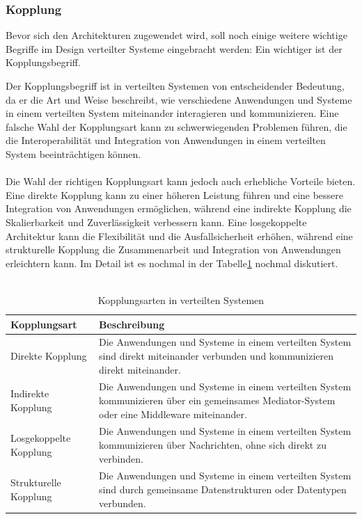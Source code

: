 \subsubsection{Kopplung}
Bevor sich den Architekturen zugewendet wird, soll noch einige weitere wichtige Begriffe im Design verteilter Systeme eingebracht werden: Ein wichtiger ist der Kopplungsbegriff. 

Der Kopplungsbegriff ist in verteilten Systemen von entscheidender Bedeutung, da er die Art und Weise beschreibt, wie verschiedene Anwendungen und Systeme in einem verteilten System miteinander interagieren und kommunizieren. Eine falsche Wahl der Kopplungsart kann zu schwerwiegenden Problemen führen, die die Interoperabilität und Integration von Anwendungen in einem verteilten System beeinträchtigen können.
\\\\
Die Wahl der richtigen Kopplungsart kann jedoch auch erhebliche Vorteile bieten. Eine direkte Kopplung kann zu einer höheren Leistung führen und eine bessere Integration von Anwendungen ermöglichen, während eine indirekte Kopplung die Skalierbarkeit und Zuverlässigkeit verbessern kann. Eine losgekoppelte Architektur kann die Flexibilität  und die Ausfallsicherheit erhöhen, während eine strukturelle Kopplung die Zusammenarbeit und Integration von Anwendungen erleichtern kann. Im Detail ist es nochmal in der Tabelle\ref{tab:kopplungsarten} nochmal diskutiert.
\\\\
\begin{table}[!h]
  \centering
  \caption{Kopplungsarten in verteilten Systemen}
  \label{tab:kopplungsarten}
  \begin{tabular}{|p{4cm}|p{7cm}|}
    \hline
    \textbf{Kopplungsart} & \textbf{Beschreibung} \\ \hline
    Direkte Kopplung & Die Anwendungen und Systeme in einem verteilten System sind direkt miteinander verbunden und kommunizieren direkt miteinander. \\ \hline
    Indirekte Kopplung & Die Anwendungen und Systeme in einem verteilten System kommunizieren über ein gemeinsames Mediator-System oder eine Middleware miteinander. \\ \hline
    Losgekoppelte Kopplung & Die Anwendungen und Systeme in einem verteilten System kommunizieren über Nachrichten, ohne sich direkt zu verbinden. \\ \hline
    Strukturelle Kopplung & Die Anwendungen und Systeme in einem verteilten System sind durch gemeinsame Datenstrukturen oder Datentypen verbunden. \\ \hline
  \end{tabular}
\end{table}
